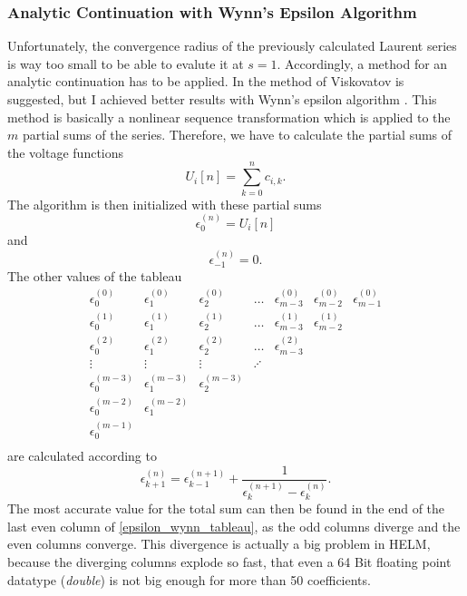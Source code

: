 \subsubsection{Analytic Continuation with Wynn's Epsilon Algorithm}

Unfortunately, the convergence radius of the previously calculated Laurent series is way too small to be able to evalute it at $s = 1$. Accordingly, a method for an analytic continuation has to be applied. In \citep{helmPatentSept2009} the method of Viskovatov is suggested, but I achieved better results with Wynn's epsilon algorithm \citep{epsilonWynn}. This method is basically a nonlinear sequence transformation which is applied to the $m$ partial sums of the series. Therefore, we have to calculate the partial sums of the voltage functions
\begin{equation}
	U_i[n] = \sum_{k = 0}^n c_{i,k}.
\end{equation}
The algorithm is then initialized with these partial sums
\begin{equation}
	\epsilon_0^{(n)} = U_i[n]
\end{equation}
and
\begin{equation}
	\epsilon_{-1}^{(n)} = 0.
\end{equation}
The other values of the tableau
\begin{equation}
	\begin{matrix}
	\epsilon_0^{(0)}	& \epsilon_1^{(0)}		& \epsilon_2^{(0)}		& \hdots 	& \epsilon_{m-3}^{(0)} 	& \epsilon_{m-2}^{(0)} 	& \epsilon_{m-1}^{(0)} \\
	\epsilon_0^{(1)}	& \epsilon_1^{(1)}		& \epsilon_2^{(1)}		& \hdots 	& \epsilon_{m-3}^{(1)} 	& \epsilon_{m-2}^{(1)} \\
	\epsilon_0^{(2)}	& \epsilon_1^{(2)}		& \epsilon_2^{(2)}		& \hdots 	& \epsilon_{m-3}^{(2)} \\
	\vdots				& \vdots				& \vdots				& \iddots \\
	\epsilon_0^{(m-3)}	& \epsilon_1^{(m-3)}	& \epsilon_2^{(m-3)}	& \\
	\epsilon_0^{(m-2)}	& \epsilon_1^{(m-2)} \\
	\epsilon_0^{(m-1)} \\
	\end{matrix}
	\label{eq:epsilon_wynn_tableau}
\end{equation}
are calculated according to
\begin{equation}
	\epsilon_{k + 1}^{(n)} = \epsilon_{k - 1}^{(n + 1)} + \frac{1}{\epsilon_{k}^{(n + 1)} - \epsilon_{k}^{(n)}}.
	\label{eq:epsilon_wynn}
\end{equation}
The most accurate value for the total sum can then be found in the end of the last even column of \eqref{epsilon_wynn_tableau}, as the odd columns diverge and the even columns converge. This divergence is actually a big problem in HELM, because the diverging columns explode so fast, that even a 64 Bit floating point datatype (\emph{double}) is not big enough for more than 50 coefficients.

